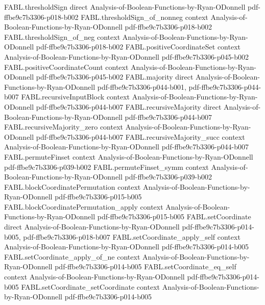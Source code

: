 \begin{theorem}
  {FABL.thresholdSign}
  {direct}
  {Analysis-of-Boolean-Functions-by-Ryan-ODonnell}
  {pdf-ffbe9c7b3306-p018-b002}
\proofstep
  {FABL.thresholdSign_of_nonneg}
  {context}
  {Analysis-of-Boolean-Functions-by-Ryan-ODonnell}
  {pdf-ffbe9c7b3306-p018-b002}
\proofstep
  {FABL.thresholdSign_of_neg}
  {context}
  {Analysis-of-Boolean-Functions-by-Ryan-ODonnell}
  {pdf-ffbe9c7b3306-p018-b002}
\proofstep
  {FABL.positiveCoordinateSet}
  {context}
  {Analysis-of-Boolean-Functions-by-Ryan-ODonnell}
  {pdf-ffbe9c7b3306-p045-b002}
\proofstep
  {FABL.positiveCoordinateCount}
  {context}
  {Analysis-of-Boolean-Functions-by-Ryan-ODonnell}
  {pdf-ffbe9c7b3306-p045-b002}
\proofstep
  {FABL.majority}
  {direct}
  {Analysis-of-Boolean-Functions-by-Ryan-ODonnell}
  {pdf-ffbe9c7b3306-p044-b001,
    pdf-ffbe9c7b3306-p044-b007}
\proofstep
  {FABL.recursiveInputBlock}
  {context}
  {Analysis-of-Boolean-Functions-by-Ryan-ODonnell}
  {pdf-ffbe9c7b3306-p044-b007}
\proofstep
  {FABL.recursiveMajority}
  {direct}
  {Analysis-of-Boolean-Functions-by-Ryan-ODonnell}
  {pdf-ffbe9c7b3306-p044-b007}
\proofstep
  {FABL.recursiveMajority_zero}
  {context}
  {Analysis-of-Boolean-Functions-by-Ryan-ODonnell}
  {pdf-ffbe9c7b3306-p044-b007}
\proofstep
  {FABL.recursiveMajority_succ}
  {context}
  {Analysis-of-Boolean-Functions-by-Ryan-ODonnell}
  {pdf-ffbe9c7b3306-p044-b007}
\proofstep
  {FABL.permuteFinset}
  {context}
  {Analysis-of-Boolean-Functions-by-Ryan-ODonnell}
  {pdf-ffbe9c7b3306-p039-b002}
\proofstep
  {FABL.permuteFinset_symm}
  {context}
  {Analysis-of-Boolean-Functions-by-Ryan-ODonnell}
  {pdf-ffbe9c7b3306-p039-b002}
\proofstep
  {FABL.blockCoordinatePermutation}
  {context}
  {Analysis-of-Boolean-Functions-by-Ryan-ODonnell}
  {pdf-ffbe9c7b3306-p015-b005}
\proofstep
  {FABL.blockCoordinatePermutation_apply}
  {context}
  {Analysis-of-Boolean-Functions-by-Ryan-ODonnell}
  {pdf-ffbe9c7b3306-p015-b005}
\proofstep
  {FABL.setCoordinate}
  {direct}
  {Analysis-of-Boolean-Functions-by-Ryan-ODonnell}
  {pdf-ffbe9c7b3306-p014-b005,
    pdf-ffbe9c7b3306-p018-b007}
\proofstep
  {FABL.setCoordinate_apply_self}
  {context}
  {Analysis-of-Boolean-Functions-by-Ryan-ODonnell}
  {pdf-ffbe9c7b3306-p014-b005}
\proofstep
  {FABL.setCoordinate_apply_of_ne}
  {context}
  {Analysis-of-Boolean-Functions-by-Ryan-ODonnell}
  {pdf-ffbe9c7b3306-p014-b005}
\proofstep
  {FABL.setCoordinate_eq_self}
  {context}
  {Analysis-of-Boolean-Functions-by-Ryan-ODonnell}
  {pdf-ffbe9c7b3306-p014-b005}
\proofstep
  {FABL.setCoordinate_setCoordinate}
  {context}
  {Analysis-of-Boolean-Functions-by-Ryan-ODonnell}
  {pdf-ffbe9c7b3306-p014-b005}

\end{theorem}
